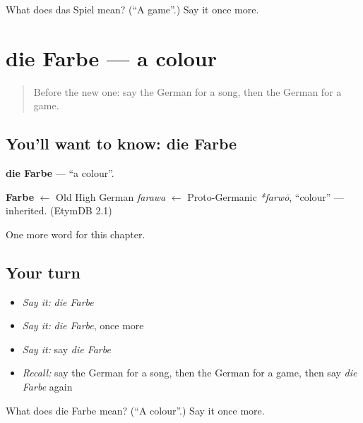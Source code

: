 \begin{tcolorbox}[breakable,colback=teal!4,colframe=teal!35!black,title={Before you move on}]
What does das Spiel mean? (\textquotedblleft{}A game\textquotedblright{}.) Say it once more.
\end{tcolorbox}
\section[die Farbe]{die Farbe — a colour}

\label{lesson:GE-C103-farbe}



\begin{quote}
Before the new one: say the German for a song, then the German for a game.
\end{quote}

\subsection*{You'll want to know: die Farbe}
\textbf{die Farbe} — \textquotedblleft{}a colour\textquotedblright{}.

\begin{cousinweb}
\textbf{Farbe} $\leftarrow$ Old High German \emph{farawa} $\leftarrow$ Proto-Germanic \emph{*farwō}, \textquotedblleft{}colour\textquotedblright{} — inherited. (EtymDB 2.1)
\end{cousinweb}

\begin{grammarlens}[title={What you've built}]
One more word for this chapter.
\end{grammarlens}

\subsection*{Your turn}
\begin{itemize}
\raggedright
  \item \emph{Say it:} \emph{die Farbe}
  \item \emph{Say it:} \emph{die Farbe}, once more
  \item \emph{Say it:} say \emph{die Farbe}
  \item \emph{Recall:} say the German for a song, then the German for a game, then say \emph{die Farbe} again
\end{itemize}

\begin{tcolorbox}[breakable,colback=teal!4,colframe=teal!35!black,title={Before you move on}]
What does die Farbe mean? (\textquotedblleft{}A colour\textquotedblright{}.) Say it once more.
\end{tcolorbox}
